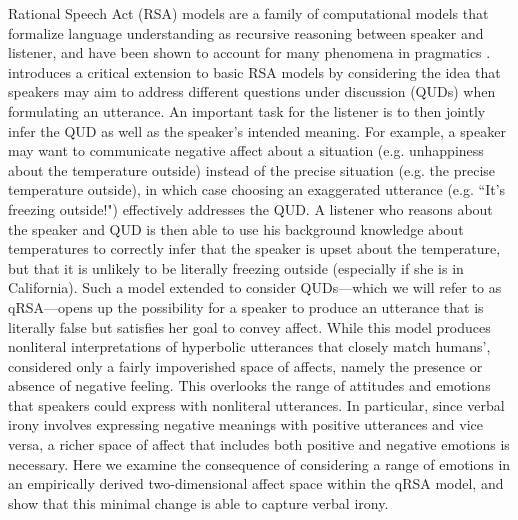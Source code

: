\documentclass[10pt,letterpaper]{article}
\begin{document}
Rational Speech Act (RSA) models are a family of computational models that formalize language understanding as recursive reasoning between speaker and listener, and have been shown to account for many phenomena in pragmatics \cite{frank2012predicting, goodman2013knowledge}. \cite{kao2014nonliteral} introduces a critical extension to basic RSA models by considering the idea that speakers may aim to address different questions under discussion (QUDs) when formulating an utterance. An important task for the listener is to then jointly infer the QUD as well as the speaker's intended meaning. For example, a speaker may want to communicate negative affect about a situation (e.g. unhappiness about the temperature outside) instead of the precise situation (e.g. the precise temperature outside), in which case choosing an exaggerated utterance (e.g. ``It's freezing outside!") effectively addresses the QUD. A listener who reasons about the speaker and QUD is then able to use his background knowledge about temperatures to correctly infer that the speaker is upset about the temperature, but that it is unlikely to be literally freezing outside (especially if she is in California). Such a model extended to consider QUDs---which we will refer to as qRSA---opens up the possibility for a speaker to produce an utterance that is literally false but satisfies her goal to convey affect. While this model produces nonliteral interpretations of hyperbolic utterances that closely match humans', \cite{kao2014nonliteral} considered only a fairly impoverished space of affects, namely the presence or absence of negative feeling. This overlooks the range of attitudes and emotions that speakers could express with nonliteral utterances. In particular, since verbal irony involves expressing negative meanings with positive utterances and vice versa, a richer space of affect that includes both positive and negative emotions is necessary. Here we examine the consequence of considering a range of emotions in an empirically derived two-dimensional affect space within the qRSA model, and show that this minimal change is able to capture verbal irony.



\end{document}
